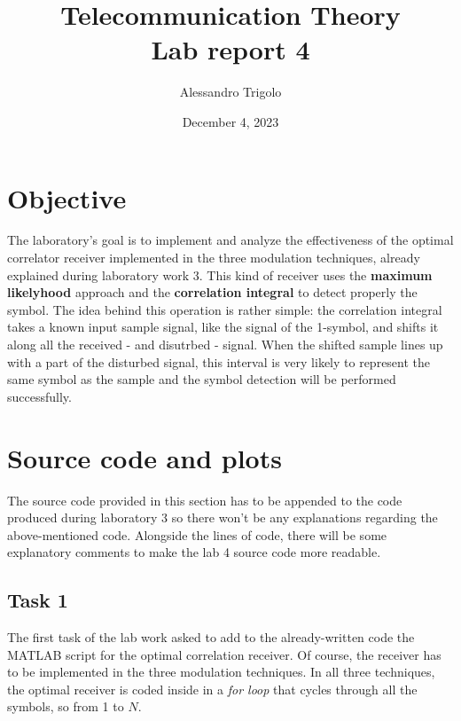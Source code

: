 \title{\vspace{160px} \textbf{\huge{Telecommunication Theory}} \\\vspace{17.5px} \LARGE{Lab report 4}  \vspace{10px}}
\author{Alessandro Trigolo}
\date{December 4, 2023}


\maketitle \newpage

\section*{Objective}
The laboratory's goal is to implement and analyze the effectiveness of the optimal correlator receiver implemented in the three modulation techniques, already explained during laboratory work 3. This kind of receiver uses the \textbf{maximum likelyhood} approach and the \textbf{correlation integral} to detect properly the symbol. The idea behind this operation is rather simple: the correlation integral takes a known input sample signal, like the signal of the 1-symbol, and shifts it along all the received - and disutrbed - signal. When the shifted sample lines up with a part of the disturbed signal, this interval is very likely to represent the same symbol as the sample and the symbol detection will be performed successfully.

\section*{Source code and plots}
\lstset{style = MATLAB}
The source code provided in this section has to be appended to the code produced during laboratory 3 so there won't be any explanations regarding the above-mentioned code. Alongside the lines of code, there will be some explanatory comments to make the lab 4 source code more readable.

\subsection*{Task 1}
The first task of the lab work asked to add to the already-written code the MATLAB script for the optimal correlation receiver. Of course, the receiver has to be implemented in the three modulation techniques. In all three techniques, the optimal receiver is coded inside in a \textsl{for loop} that cycles through all the symbols, so from 1 to $N$.

